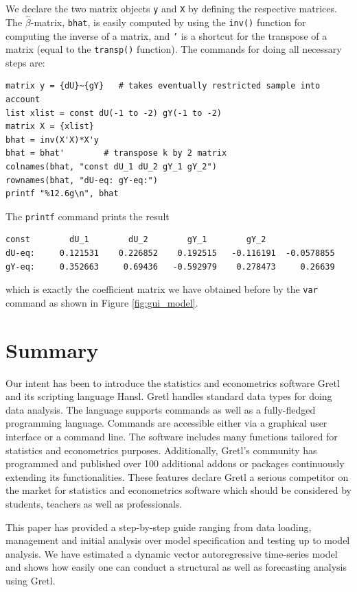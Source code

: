 \documentclass[11pt]{article}
\begin{document}
We declare the two matrix objects \texttt{y} and \texttt{X} by defining the respective matrices. The $ \hat \beta $-matrix, \texttt{bhat}, is easily computed by using the \texttt{inv()} function for computing the inverse of a matrix, and \texttt{'} is a shortcut for the transpose of a matrix (equal to the \texttt{transp()} function). The commands for doing all necessary steps are:
\begin{Verbatim}[baselinestretch=0.75, fontsize=\small]
matrix y = {dU}~{gY}   # takes eventually restricted sample into account
list xlist = const dU(-1 to -2) gY(-1 to -2)
matrix X = {xlist}
bhat = inv(X'X)*X'y
bhat = bhat'		# transpose k by 2 matrix
colnames(bhat, "const dU_1 dU_2 gY_1 gY_2")
rownames(bhat, "dU-eq: gY-eq:")
printf "%12.6g\n", bhat
\end{Verbatim}
The \texttt{printf} command prints the result
\begin{Verbatim}[baselinestretch=0.75, fontsize=\small]
              const        dU_1        dU_2        gY_1        gY_2
dU-eq:     0.121531    0.226852    0.192515   -0.116191  -0.0578855
gY-eq:     0.352663     0.69436   -0.592979    0.278473     0.26639
\end{Verbatim}
which is exactly the coefficient matrix we have obtained before by the \texttt{var} command as shown in Figure \ref{fig:gui_model}.


\section{Summary}
Our intent has been to introduce the statistics and econometrics software Gretl and its scripting language Hansl. Gretl handles standard data types for doing data analysis. The language supports commands as well as a fully-fledged programming language. Commands are accessible either via a graphical user interface or a command line. The software includes many functions tailored for statistics and econometrics purposes. Additionally, Gretl's community has programmed and published over 100 additional addons or packages continuously extending its functionalities. These features declare Gretl a serious competitor on the market for statistics and econometrics software which should be considered by students, teachers as well as professionals.

This paper has provided a step-by-step guide ranging from data loading, management and initial analysis over model specification and testing up to model analysis. We have estimated a dynamic vector autoregressive time-series model and shows how easily one can conduct a structural as well as forecasting analysis using Gretl.
\end{document}
